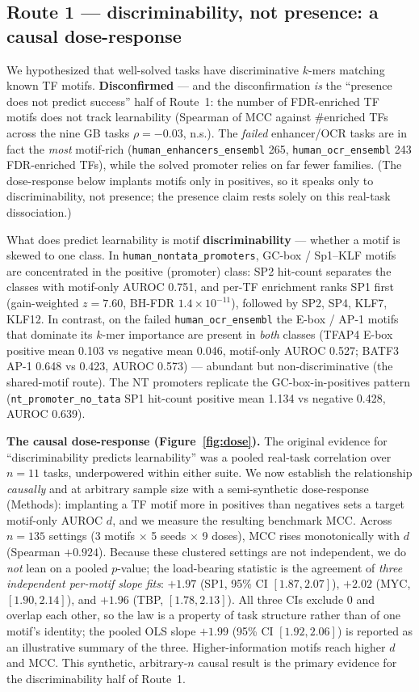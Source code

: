 \documentclass{ws-procs11x85}
\begin{document}
\subsection{Route 1 --- discriminability, not presence: a causal dose-response}\label{route-1}

We hypothesized that well-solved tasks have discriminative $k$-mers matching known TF motifs.
\textbf{Disconfirmed} --- and the disconfirmation \emph{is} the ``presence does not predict success'' half
of Route~1: the number of FDR-enriched TF motifs does not track learnability (Spearman of MCC against
\#enriched TFs across the nine GB tasks $\rho{=}-0.03$, n.s.). The \emph{failed} enhancer/OCR tasks are in
fact the \emph{most} motif-rich (\texttt{human\_enhancers\_ensembl} 265, \texttt{human\_ocr\_ensembl} 243
FDR-enriched TFs), while the solved promoter relies on far fewer families. (The dose-response below
implants motifs only in positives, so it speaks only to discriminability, not presence; the presence
claim rests solely on this real-task dissociation.)

What does predict learnability is motif \textbf{discriminability} --- whether a motif is skewed to one
class. In \texttt{human\_nontata\_promoters}, GC-box / Sp1--KLF motifs are concentrated in the positive
(promoter) class: SP2 hit-count separates the classes with motif-only AUROC 0.751, and per-TF enrichment
ranks SP1 first (gain-weighted $z=7.60$, BH-FDR $1.4\times10^{-11}$), followed by SP2, SP4, KLF7, KLF12.
In contrast, on the failed \texttt{human\_ocr\_ensembl} the E-box / AP-1 motifs that dominate its $k$-mer
importance are present in \emph{both} classes (TFAP4 E-box positive mean 0.103 vs negative mean 0.046,
motif-only AUROC 0.527; BATF3 AP-1 0.648 vs 0.423, AUROC 0.573) --- abundant but non-discriminative (the
shared-motif route). The NT promoters replicate the GC-box-in-positives pattern
(\texttt{nt\_promoter\_no\_tata} SP1 hit-count positive mean 1.134 vs negative 0.428, AUROC 0.639).

\textbf{The causal dose-response (Figure~\ref{fig:dose}).} The original evidence for ``discriminability
predicts learnability'' was a pooled real-task correlation over $n{=}11$ tasks, underpowered within
either suite. We now establish the relationship \emph{causally} and at arbitrary sample size with a
semi-synthetic dose-response (Methods): implanting a TF motif more in positives than negatives sets a
target motif-only AUROC $d$, and we measure the resulting benchmark MCC. Across $n{=}135$ settings (3
motifs $\times$ 5 seeds $\times$ 9 doses), MCC rises monotonically with $d$ (Spearman $+0.924$). Because these
clustered settings are not independent, we do \emph{not} lean on a pooled $p$-value; the load-bearing
statistic is the agreement of \emph{three independent per-motif slope fits}: $+1.97$ (SP1, 95\% CI $[1.87, 2.07]$), $+2.02$ (MYC, $[1.90, 2.14]$), and $+1.96$ (TBP,
$[1.78, 2.13]$). All three CIs exclude 0 and overlap each other, so the law is a property of task
structure rather than of one motif's identity; the pooled OLS slope $+1.99$ (95\% CI $[1.92, 2.06]$) is
reported as an illustrative summary of the three. Higher-information motifs reach higher $d$ and MCC. This synthetic, arbitrary-$n$ causal result is
the primary evidence for the discriminability half of Route~1.
\end{document}
